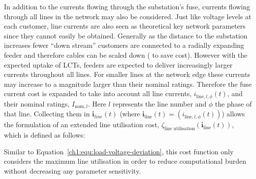 


In addition to the currents flowing through the substation's fuse, currents flowing through all lines in the network may also be considered.
Just like voltage levels at each customer, line currents are also seen as theoretical key network parameters since they cannot easily be obtained.
Generally as the distance to the substation increases fewer ``down stream'' customers are connected to a radially expanding feeder and therefore cables can be scaled down ( to save cost).
However with the expected uptake of LCTs, feeders are expected to deliver increasingly larger currents throughout all lines.
For smaller lines at the network edge these currents may increase to a magnitude larger than their nominal ratings.
Therefore the fuse current cost is expanded to take into account all line currents, $i_{\text{line},l,\phi}(t)$, and their nominal ratings, $I_{\text{nom}, l}$.
Here $l$ represents the line number and $\phi$ the phase of that line.
Collecting them in $\textbf{i}_{line}(t)$ (where $\textbf{i}_\text{line}(t) = (i_{\text{line},l,\phi}(t))$) allows the formulation of an extended line utilisation cost, $\zeta_\text{line utilisation}(\textbf{i}_\text{line}(t))$, which is defined as follows:



Similar to Equation~\ref{ch1:equ:load-voltage-deviation}, this cost function only considers the maximum line utilisation in order to reduce computational burden without decreasing any parameter sensitivity.
